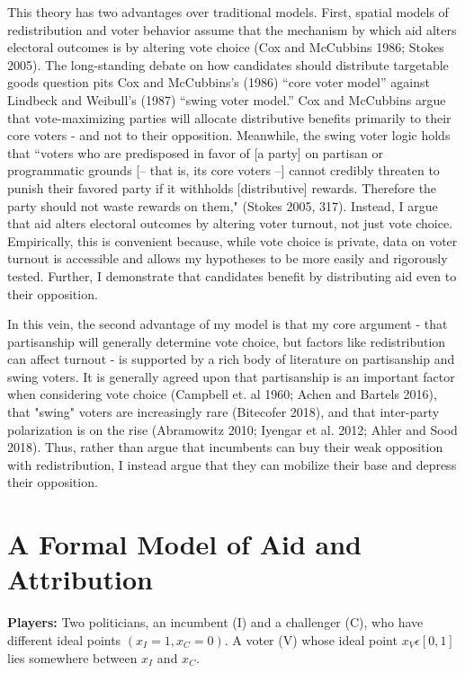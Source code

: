 \documentclass[12pt]{paper}
\begin{document}
This theory has two  advantages over traditional models. First, spatial models of redistribution and voter behavior assume that the mechanism by which aid alters electoral outcomes is by altering vote choice (Cox and McCubbins 1986; Stokes 2005). The long-standing debate on how candidates should distribute targetable goods question pits Cox and McCubbins's (1986) ``core voter model” against Lindbeck and Weibull's (1987) ``swing voter model.” Cox and McCubbins argue that vote-maximizing parties will allocate distributive benefits primarily to their core voters - and not to their opposition. Meanwhile, the swing voter logic holds that ``voters who are predisposed in favor of [a party] on partisan or programmatic grounds [– that is, its core voters –] cannot credibly threaten to punish their favored party if it withholds [distributive] rewards. Therefore the party should not waste rewards on them," (Stokes 2005, 317). Instead, I argue that aid alters electoral outcomes by altering voter turnout, not just vote choice. Empirically, this is convenient because, while vote choice is private, data on voter turnout is  accessible and allows my hypotheses to be more easily and rigorously tested. Further, I demonstrate that candidates benefit by distributing aid even to their opposition.

In this vein, the second advantage of my model is that my core argument - that partisanship will generally determine vote choice, but factors like redistribution can affect turnout - is supported by a rich body of literature on partisanship and swing voters. It is generally agreed upon that partisanship is an important factor when considering vote choice (Campbell et. al 1960; Achen and Bartels 2016), that "swing" voters are increasingly rare (Bitecofer 2018), and that inter-party polarization is on the rise (Abramowitz 2010; Iyengar et al. 2012; Ahler and Sood 2018). Thus, rather than argue that incumbents can buy their weak opposition with redistribution, I instead argue that they can mobilize their base and depress their opposition.

\section{A Formal Model of Aid and Attribution}
\textbf{Players:} Two politicians, an incumbent (I) and a challenger (C), who have different ideal points $(x_I=1, x_C=0)$. A voter (V) whose ideal point $x_V \epsilon [0,1]$ lies somewhere between $x_I$ and $x_C.$
\end{document}
